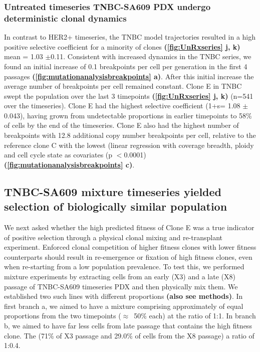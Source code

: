 \subsubsection{Untreated timeseries TNBC-SA609 PDX undergo deterministic clonal dynamics}
In contrast to HER2+ timeseries, the TNBC model trajectories resulted in a high positive selective coefficient for a minority of clones \textbf{(\autoref{fig:UnRxseries} j, k)} mean = 1.03 $\pm $0.11. Consistent with increased dynamics in the TNBC series, we found an initial increase of 0.1 breakpoints per cell per generation in the first 4 passages \textbf{(\autoref{fig:mutationanalysisbreakpoints} a)}. After this initial increase the average number of breakpoints per cell remained constant.
 Clone E in TNBC swept the population over the last 3 timepoints \textbf{(\autoref{fig:UnRxseries} j, k)} (n=541 over the timeseries). Clone E had the highest selective coefficient (1+s= 1.08 $\pm $ 0.043), having grown from undetectable proportions in earlier timepoints to 58\% of cells by the end of the timeseries. Clone E also had the highest number of breakpoints with 12.8 additional copy number breakpoints per cell, relative to the reference clone C with the lowest (linear regression with coverage breadth, ploidy and cell cycle state as covariates (p $<$0.0001) \textbf{(\autoref{fig:mutationanalysisbreakpoints} c)}.


\subsection{TNBC-SA609 mixture timeseries yielded selection of biologically similar population}
We next asked whether the high predicted fitness of Clone E was a true indicator of positive selection through a physical clonal mixing and re-transplant experiment. Enforced clonal competition of higher fitness clones with lower fitness counterparts should result in re-emergence or fixation of high fitness clones, even when re-starting from a low population prevalence. To test this, we performed mixture experiments by extracting cells from an early (X3) and a late (X8) passage of TNBC-SA609 timeseries PDX and then physically mix them. We established two such lines with different proportions \textbf{(also see methods)}.
In first branch a, we aimed to have a mixture comprising approximately of equal proportions from the two timepoints ($\approx$~50\% each) at the ratio of 1:1. In branch b, we aimed to have far less cells from late passage that contains the high fitness clone. The (71\% of X3 passage and 29.0\% of cells from the X8 passage) a ratio of 1:0.4.


